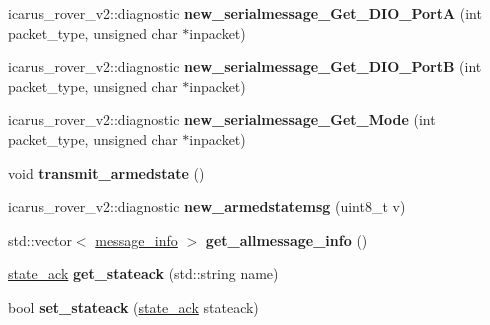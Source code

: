 \begin{DoxyCompactItemize}
\item 
\mbox{\label{classGPIONodeProcess_aa10decbb9cfcdd9cf649f58ab44f66e8}} 
icarus\+\_\+rover\+\_\+v2\+::diagnostic {\bfseries new\+\_\+serialmessage\+\_\+\+Get\+\_\+\+D\+I\+O\+\_\+\+PortA} (int packet\+\_\+type, unsigned char $\ast$inpacket)
\item 
\mbox{\label{classGPIONodeProcess_a6efc6b66232b38e8399cac04825f7edc}} 
icarus\+\_\+rover\+\_\+v2\+::diagnostic {\bfseries new\+\_\+serialmessage\+\_\+\+Get\+\_\+\+D\+I\+O\+\_\+\+PortB} (int packet\+\_\+type, unsigned char $\ast$inpacket)
\item 
\mbox{\label{classGPIONodeProcess_a33d8920e3134280730ee3715e45899eb}} 
icarus\+\_\+rover\+\_\+v2\+::diagnostic {\bfseries new\+\_\+serialmessage\+\_\+\+Get\+\_\+\+Mode} (int packet\+\_\+type, unsigned char $\ast$inpacket)
\item 
\mbox{\label{classGPIONodeProcess_a535bd21ce88be5760710aa13b9ad08fd}} 
void {\bfseries transmit\+\_\+armedstate} ()
\item 
\mbox{\label{classGPIONodeProcess_afb1ee33dc45babb0cdd063fd282d048a}} 
icarus\+\_\+rover\+\_\+v2\+::diagnostic {\bfseries new\+\_\+armedstatemsg} (uint8\+\_\+t v)
\item 
\mbox{\label{classGPIONodeProcess_a08ca4544ac0afadb8226fa62ed6a4be2}} 
std\+::vector$<$ \hyperlink{structmessage__info}{message\+\_\+info} $>$ {\bfseries get\+\_\+allmessage\+\_\+info} ()
\item 
\mbox{\label{classGPIONodeProcess_aaea2a5c5b471c20a01be0591fc65afa9}} 
\hyperlink{structstate__ack}{state\+\_\+ack} {\bfseries get\+\_\+stateack} (std\+::string name)
\item 
\mbox{\label{classGPIONodeProcess_a89c10952dd784daac0e299224c865b29}} 
bool {\bfseries set\+\_\+stateack} (\hyperlink{structstate__ack}{state\+\_\+ack} stateack)
\item 
\mbox{\label{classGPIONodeProcess_a732dea78545c3932961c07739051af91}} 

\end{DoxyCompactItemize}
